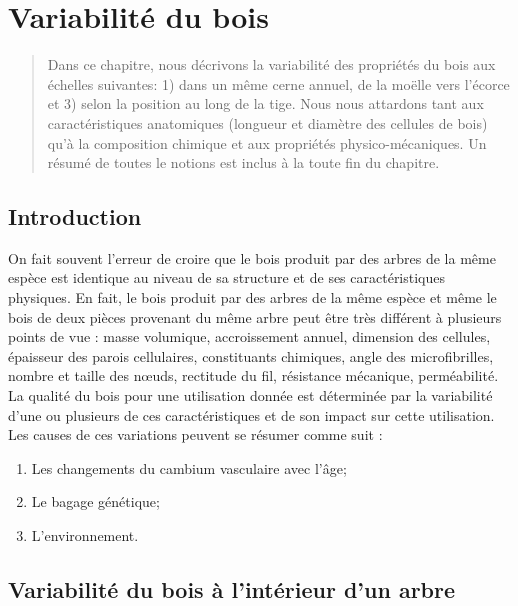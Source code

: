 \chapter{Variabilité du bois}\label{variabilite}

\begin{abstract}
Dans ce chapitre, nous décrivons la variabilité des propriétés du bois aux échelles suivantes: 1) dans un même cerne annuel, de la moëlle vers l'écorce et 3) selon la position au long de la tige. Nous nous attardons tant aux caractéristiques anatomiques (longueur et diamètre des cellules de bois) qu'à la composition chimique et aux propriétés physico-mécaniques. Un résumé de toutes le notions est inclus à la toute fin du chapitre.
\end{abstract}

\minitoc

\section{Introduction}

On fait souvent l'erreur de croire que le bois produit par des arbres de la même espèce est identique au niveau de sa structure et de ses caractéristiques physiques. En fait, le bois produit par des arbres de la même espèce et même le bois de deux pièces provenant du même arbre peut être très différent à plusieurs points de vue : masse volumique, accroissement annuel, dimension des cellules, épaisseur des parois cellulaires, constituants chimiques, angle des microfibrilles, nombre et taille des nœuds, rectitude du fil, résistance mécanique, perméabilité.\\

La \og qualité \fg du bois pour une utilisation donnée est déterminée par la variabilité d'une ou plusieurs de ces caractéristiques et de son impact sur cette utilisation. Les causes de ces variations peuvent se résumer comme suit :

\begin{enumerate}
\item Les changements du cambium vasculaire avec l'âge;
\item Le bagage génétique;
\item L'environnement.
\end{enumerate}

\section{Variabilité du bois à l'intérieur d'un arbre}

